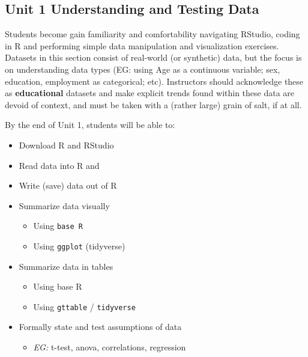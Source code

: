 \documentclass[
]{book}
\providecommand{\tightlist}{%
  \setlength{\itemsep}{0pt}\setlength{\parskip}{0pt}}
\begin{document}
\newpage

\hypertarget{unit-1-understanding-and-testing-data}{%
\subsection*{Unit 1 Understanding and Testing Data}\label{unit-1-understanding-and-testing-data}}

Students become gain familiarity and comfortability navigating RStudio, coding in R and performing simple data manipulation and visualization exercises. Datasets in this section consist of real-world (or synthetic) data, but the focus is on understanding data types (EG: using Age as a continuous variable; sex, education, employment as categorical; etc). Instructors should acknowledge these as \textbf{educational} datasets and make explicit trends found within these data are devoid of context, and must be taken with a (rather large) grain of salt, if at all.

By the end of Unit 1, students will be able to:

\begin{itemize}
\tightlist
\item
  Download R and RStudio
\item
  Read data into R and
\item
  Write (save) data out of R
\item
  Summarize data visually

  \begin{itemize}
  \tightlist
  \item
    Using \texttt{base\ R}
  \item
    Using \texttt{ggplot} (tidyverse)
  \end{itemize}
\item
  Summarize data in tables

  \begin{itemize}
  \tightlist
  \item
    Using base R
  \item
    Using \texttt{gttable} / \texttt{tidyverse}
  \end{itemize}
\item
  Formally state and test assumptions of data

  \begin{itemize}
  \tightlist
  \item
    \emph{EG:} t-test, anova, correlations, regression
  \end{itemize}
\end{itemize}
\end{document}
